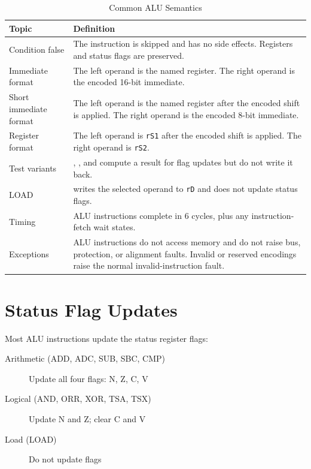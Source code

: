 \begin{table}[H]
	\centering
	\begin{tabular}{lp{9cm}}
		\toprule
		\textbf{Topic} & \textbf{Definition} \\
		\midrule
		Condition false & The instruction is skipped and has no side effects. Registers and status flags are preserved. \\
		Immediate format & The left operand is the named register. The right operand is the encoded 16-bit immediate. \\
		Short immediate format & The left operand is the named register after the encoded shift is applied. The right operand is the encoded 8-bit immediate. \\
		Register format & The left operand is \texttt{rS1} after the encoded shift is applied. The right operand is \texttt{rS2}. \\
		Test variants & \mnemonic{CMP}, \mnemonic{TSA}, and \mnemonic{TSX} compute a result for flag updates but do not write it back. \\
		LOAD & \mnemonic{LOAD} writes the selected operand to \texttt{rD} and does not update status flags. \\
		Timing & ALU instructions complete in 6 cycles, plus any instruction-fetch wait states. \\
		Exceptions & ALU instructions do not access memory and do not raise bus, protection, or alignment faults. Invalid or reserved encodings raise the normal invalid-instruction fault. \\
		\bottomrule
	\end{tabular}
	\caption{Common ALU Semantics}
	\label{tab:alu-common-semantics}
\end{table}

\section{Status Flag Updates}

Most ALU instructions update the status register flags:

\begin{description}
	\item[Arithmetic (ADD, ADC, SUB, SBC, CMP)] Update all four flags: N, Z, C, V
	\item[Logical (AND, ORR, XOR, TSA, TSX)] Update N and Z; clear C and V
	\item[Load (LOAD)] Do not update flags
\end{description}

